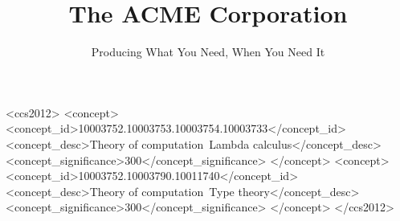 \acmDOI{}




\usepackage{booktabs}
\usepackage{subcaption}
\usepackage{amsmath}
\usepackage[all,cmtip]{xy}
\usepackage[nameinlink,noabbrev,capitalise]{cleveref}
\usepackage{csquotes}
\usepackage{booktabs}
\usepackage{microtype}
\usepackage{stmaryrd}
\usepackage{graphicx}
\usepackage{enumitem}
\usepackage{mathtools}
\usepackage{courier}
\usepackage{bussproofs}
\usepackage{tikz-cd}
\usepackage{diagbox}
\usepackage{afterpage}
\usepackage[normalem]{ulem}
\usepackage{dashbox}
\usepackage{mdframed}
\usepackage[mathscr]{euscript}
\DeclareMathAlphabet{}
\usepackage{colortbl}
\usepackage{anyfontsize}
\usepackage{listings}
\usepackage{alltt} %
\usepackage{multicol} %
\usepackage{scalerel} %

\usepackage[]{todonotes}
\newcommand{\david}[2][]{\todo[inline,color=red!40,author=David,#1]{#2}}




\usepackage{xcolor}



\title{The ACME Corporation}
\subtitle{Producing What You Need, When You Need It}



\begin{CCSXML}
  <ccs2012>
  <concept>
  <concept_id>10003752.10003753.10003754.10003733</concept_id>
  <concept_desc>Theory of computation~Lambda calculus</concept_desc>
  <concept_significance>300</concept_significance>
  </concept>
  <concept>
  <concept_id>10003752.10003790.10011740</concept_id>
  <concept_desc>Theory of computation~Type theory</concept_desc>
  <concept_significance>300</concept_significance>
  </concept>
  </ccs2012>
\end{CCSXML}

